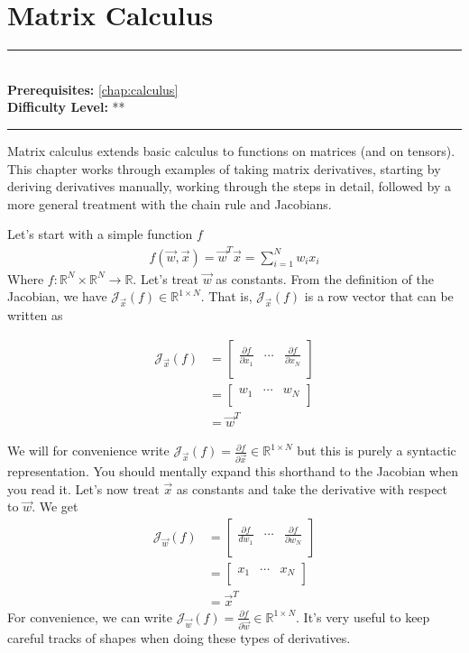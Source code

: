 \documentclass[book.tex]{subfiles}
\begin{document}
\chapter{Matrix Calculus}
\label{chap:matrix_calculus}
\noindent\rule{11cm}{0.4pt} \\
\textbf{Prerequisites:} \autoref{chap:calculus} \\
\textbf{Difficulty Level:} ** \\
\noindent\rule{11cm}{0.4pt}
\vspace{5mm}

Matrix calculus extends basic calculus to functions on matrices (and on tensors). This chapter works through examples of taking matrix derivatives, starting by deriving derivatives manually, working through the steps in detail, followed by a more general treatment with the chain rule and Jacobians.

Let's start with a simple function $f$
\begin{align}
    f(\vec{w}, \vec{x}) = \vec{w}^T \vec{x} = \sum_{i=1}^N w_i x_i 
\end{align}
Where $f: \mathbb{R}^N \times \mathbb{R}^N \to \mathbb{R}$. Let's treat $\vec{w}$ as constants. From the definition of the Jacobian, we have $\mathcal{J}_{\vec{x}}(f) \in \mathbb{R}^{1 \times N}$. That is, $\mathcal{J}_{\vec{x}}(f)$ is a row vector that can be written as

\begin{align}
\mathcal{J}_{\vec{x}}(f) &= \begin{bmatrix}
     \frac{\partial f}{\partial x_1} & \cdots & \frac{\partial f}{ \partial x_N}  \\
    \end{bmatrix} \\
    &= \begin{bmatrix}
    w_1 & \cdots & w_N \\
    \end{bmatrix} \\
    &= \vec{w}^T
\end{align}

We will for convenience write $\mathcal{J}_{\vec{x}}(f) = \frac{\partial f}{\partial \vec{x}} \in \mathbb{R}^{1 \times N}$ but this is purely a syntactic representation. You should mentally expand this shorthand to the Jacobian when you read it. Let's now treat $\vec{x}$ as constants and take the derivative with respect to $\vec{w}$. We get
\begin{align}
\mathcal{J}_{\vec{w}}(f) &= \begin{bmatrix}
     \frac{\partial f}{dw_1} & \cdots & \frac{\partial f}{\partial w_N}  \\
    \end{bmatrix} \\
    &= \begin{bmatrix}
    x_1 & \cdots & x_N \\
    \end{bmatrix} \\
    &= \vec{x}^T 
\end{align}
For convenience, we can write $\mathcal{J}_{\vec{w}}(f) = \frac{\partial f}{\partial \vec{w}} \in \mathbb{R}^{1 \times N}$. It's very useful to keep careful tracks of shapes when doing these types of derivatives.
\end{document}
